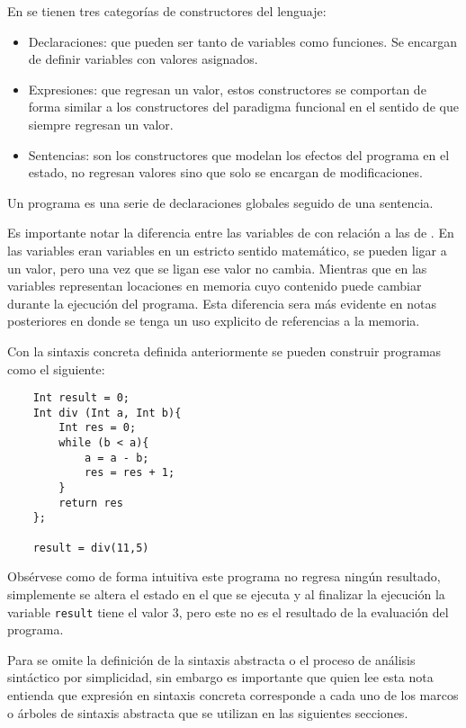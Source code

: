 \documentclass[12pt]{extarticle}
\begin{document}
En \tinyc se tienen tres categorías de constructores del lenguaje:
\begin{itemize}
    \item Declaraciones: que pueden ser tanto de variables como funciones. Se encargan de definir variables con valores asignados.
    \item Expresiones: que regresan un valor, estos constructores se comportan de forma similar a los constructores del paradigma funcional en el sentido de que siempre regresan un valor.
    \item Sentencias: son los constructores que modelan los efectos del programa en el estado, no regresan valores sino que solo se encargan de modificaciones.
\end{itemize}

Un programa es una serie de declaraciones globales seguido de una sentencia.

\begin{remark} Es importante notar la diferencia entre las variables de \tinyc con relación a las de \minhs. En \minhs las variables eran variables en un estricto sentido matemático, se pueden ligar a un valor, pero una vez que se ligan ese valor no cambia. Mientras que en \tinyc las variables representan locaciones en memoria cuyo contenido puede cambiar durante la ejecución del programa. Esta diferencia sera más evidente en notas posteriores en donde se tenga un uso explicito de referencias a la memoria.
\end{remark} 

\begin{example} Con la sintaxis concreta definida anteriormente se pueden construir programas como el siguiente:

\begin{verbatim}
    Int result = 0;
    Int div (Int a, Int b){
        Int res = 0;
        while (b < a){
            a = a - b;
            res = res + 1;
        }
        return res
    };
    
    result = div(11,5)
\end{verbatim}

Obsérvese como de forma intuitiva este programa no regresa ningún resultado, simplemente se altera el estado en el que se ejecuta y al finalizar la ejecución la variable {\tt result} tiene el valor $3$, pero este no es el resultado de la evaluación del programa.
\end{example}

\begin{remark} Para \tinyc se omite la definición de la sintaxis abstracta o el proceso de análisis sintáctico por simplicidad, sin embargo es importante que quien lee esta nota entienda que expresión en sintaxis concreta corresponde a cada uno de los marcos o árboles de sintaxis abstracta que se utilizan en las siguientes secciones.
\end{remark}
\end{document}
